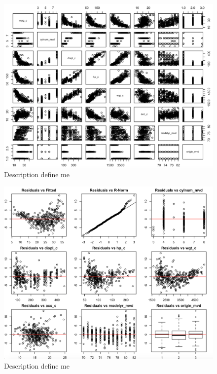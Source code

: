 \documentclass{article}
\begin{document}
\clearpage
\newpage 

\begin{figure}
	\centering
	\includegraphics[width=1\linewidth]{1p_ScPlMtr}
	\caption[TOC Define Me]
	{Description define me}
\end{figure}

\clearpage
\newpage 

\begin{figure}
	\centering
	\includegraphics[width=1\linewidth]{2-10p_resall}
	\caption[TOC Define Me]
	{Description define me}
\end{figure}
\end{document}
